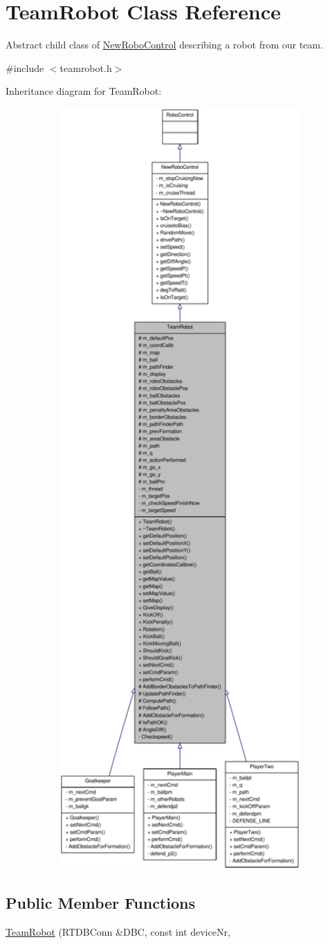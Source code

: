 \hypertarget{classTeamRobot}{
\section{TeamRobot Class Reference}
\label{classTeamRobot}
}


Abstract child class of \hyperlink{classNewRoboControl}{NewRoboControl} describing a robot from our team.  




{\ttfamily \#include $<$teamrobot.h$>$}



Inheritance diagram for TeamRobot:\nopagebreak
\begin{figure}[H]
\begin{center}
\leavevmode
\includegraphics[width=400pt]{classTeamRobot__inherit__graph}
\end{center}
\end{figure}
\subsection*{Public Member Functions}
\begin{DoxyCompactItemize}
\item 
\hyperlink{classTeamRobot_a4b116f58f0a1568a886d03b0c71df20c}{TeamRobot} (RTDBConn \&DBC, const int deviceNr, 
\end{DoxyCompactItemize}
